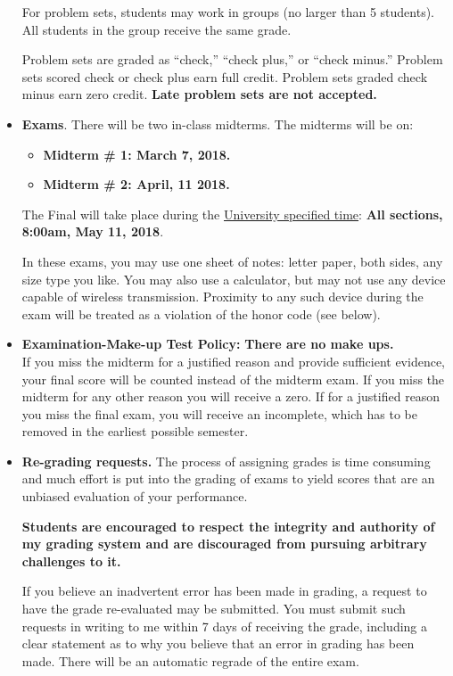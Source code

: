 \documentclass[12pt,pdftex,twoside,letterpaper]{exam}
\begin{document}
\begin{itemize}
    For problem sets, students may work in groups (no larger than 5 students). All students in the group receive the same grade.

    Problem sets are graded as ``check,'' ``check plus,'' or ``check minus.'' Problem sets scored check or check plus earn full credit. Problem sets graded check minus earn zero credit. \textbf{Late problem sets are not accepted.}

\item \textbf{Exams}. There will be two in-class midterms. The midterms will be on:
\begin{itemize}
\item\textbf{ Midterm \# 1: March 7, 2018.}
\item\textbf{ Midterm \# 2: April, 11 2018.}
\end{itemize}
The Final will take place during the \href{http://www.nyu.edu/registrar/pdf/Final_exam_schedule_Spring_2018.pdf}{University specified time}: \textbf{All sections, 8:00am, May 11, 2018}.

In these exams, you may use one sheet of notes: letter paper, both sides, any size type you like. You may also use a calculator, but may not use any device capable of wireless transmission.  Proximity to any such device during the exam will be treated as a violation of the honor code (see below).

\item \textbf{Examination-Make-up Test Policy:} \textbf{There are no make ups.}\\

 If you miss the midterm for a justified reason and provide sufficient evidence, your final score will be counted instead of the midterm exam. If you miss the midterm for any other reason you will receive a zero. If for a justified reason you miss the final exam, you will receive an incomplete, which has to be removed in the earliest possible semester.

\item \textbf{Re-grading requests.} The process of assigning grades is time consuming and much effort is put into the grading of exams to yield scores that are an unbiased evaluation of your performance.

    \textbf{Students are encouraged to respect the integrity and authority of my grading system and are discouraged from pursuing arbitrary challenges to it.}

If you believe an inadvertent error has been made in grading, a request to have the grade re-evaluated may be submitted. You must submit such requests in writing to me within 7 days of receiving the grade, including a clear statement as to why you believe that an error in grading has been made. There will be an automatic regrade of the entire exam.

\end{itemize}
\end{document}
